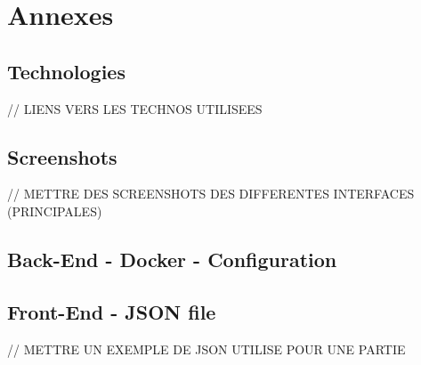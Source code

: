 \documentclass{tnreport}
\begin{document}
\cleardoublepage

\appendix
\part*{Annexes}

\cleardoublepage

\chapter{Technologies}

// LIENS VERS LES TECHNOS UTILISEES

\cleardoublepage

\chapter{Screenshots}

// METTRE DES SCREENSHOTS DES DIFFERENTES INTERFACES (PRINCIPALES) \\

\cleardoublepage

\chapter{Back-End - Docker - Configuration}
\label{annexe:docker_compose}
\vspace{0.5cm}
\begin{center}
	\vspace*{-0.8in}
	
\end{center}

\cleardoublepage

\chapter{Front-End - JSON file}

// METTRE UN EXEMPLE DE JSON UTILISE POUR UNE PARTIE \\
\end{document}
